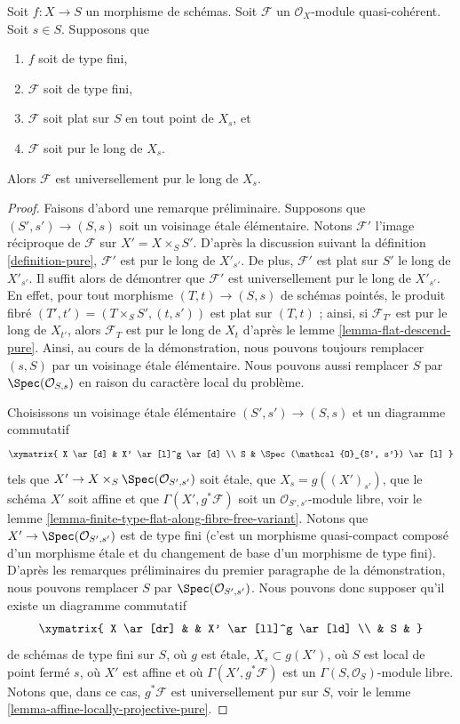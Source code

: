 \begin{lemma}
\label{lemma-finite-type-flat-pure-along-fibre-is-universal}
Soit $f : X \to S$ un morphisme de schémas.
Soit $\mathcal{F}$ un $\mathcal{O}_X$-module quasi-cohérent.
Soit $s \in S$.
Supposons que
\begin{enumerate}
\item $f$ soit de type fini,
\item $\mathcal{F}$ soit de type fini,
\item $\mathcal{F}$ soit plat sur $S$ en tout point de $X_s$, et
\item $\mathcal{F}$ soit pur le long de $X_s$.
\end{enumerate}
Alors $\mathcal{F}$ est universellement pur le long de $X_s$.
\end{lemma}

\begin{proof}
Faisons d'abord une remarque préliminaire. Supposons que $(S', s') \to (S, s)$
soit un voisinage \'etale élémentaire. Notons $\mathcal{F}'$
l'image réciproque de $\mathcal{F}$ sur $X' = X \times_S S'$.
D'après la discussion suivant la
définition \ref{definition-pure},
$\mathcal{F}'$ est pur le long de $X'_{s'}$. De plus, $\mathcal{F}'$
est plat sur $S'$ le long de $X'_{s'}$. Il suffit alors de démontrer
que $\mathcal{F}'$ est universellement pur le long de $X'_{s'}$. En effet, pour
tout morphisme $(T, t) \to (S, s)$ de schémas pointés,
le produit fibré $(T', t') = (T \times_S S', (t, s'))$ est plat sur $(T, t)$ ;
ainsi, si $\mathcal{F}_{T'}$ est pur le long de $X_{t'}$, alors
$\mathcal{F}_T$ est pur le long de $X_t$ d'après le
lemme \ref{lemma-flat-descend-pure}.
Ainsi, au cours de la démonstration, nous pouvons toujours remplacer $(s, S)$ par un voisinage
\'etale élémentaire.
Nous pouvons aussi remplacer $S$ par $\Spec(\mathcal{O}_{S, s})$
en raison du caractère local du problème.

\medskip\noindent
Choisissons un voisinage \'etale élémentaire $(S', s') \to (S, s)$ et
un diagramme commutatif
$$
\xymatrix{
X \ar[d] & X' \ar[l]^g \ar[d] \\
S & \Spec(\mathcal{O}_{S', s'}) \ar[l]
}
$$
tels que $X' \to X \times_S \Spec(\mathcal{O}_{S', s'})$
soit \'etale, que $X_s = g((X')_{s'})$, que le schéma $X'$ soit affine
et que $\Gamma(X', g^*\mathcal{F})$ soit un
$\mathcal{O}_{S', s'}$-module libre, voir le
lemme \ref{lemma-finite-type-flat-along-fibre-free-variant}.
Notons que $X' \to \Spec(\mathcal{O}_{S', s'})$ est de type fini
(c'est un morphisme quasi-compact composé d'un morphisme \'etale
et du changement de base d'un morphisme de type fini).
D'après les remarques préliminaires du premier paragraphe de la démonstration,
nous pouvons remplacer $S$ par $\Spec(\mathcal{O}_{S', s'})$. Nous pouvons donc
supposer qu'il existe un diagramme commutatif
$$
\xymatrix{
X \ar[dr] & & X' \ar[ll]^g \ar[ld] \\
& S &
}
$$
de schémas de type fini sur $S$, où $g$ est \'etale, $X_s \subset g(X')$,
où $S$ est local de point fermé $s$, où $X'$ est affine et où
$\Gamma(X', g^*\mathcal{F})$ est un $\Gamma(S, \mathcal{O}_S)$-module libre.
Notons que, dans ce cas, $g^*\mathcal{F}$ est universellement pur sur $S$, voir le
lemme \ref{lemma-affine-locally-projective-pure}.


\end{proof}
